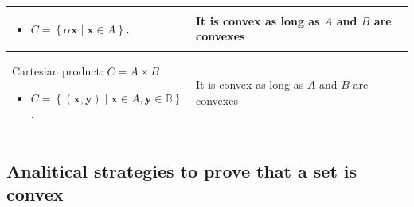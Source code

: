 \documentclass{article}
\begin{document}
\begin{xltabular}[l]{0.5\linewidth}{|X|X|}
\begin{itemize}[leftmargin=*]
		\item \(C = \left\{ \alpha \mathbf{x} \mid \mathbf{x} \in A \right\}\).
	\end{itemize} & It is convex as long as \(A\) and \(B\) are convexes\\
	\hline
	Cartesian product: $C = A \times B $
	\begin{itemize}[leftmargin=*]
		\item \(C = \left\{ (\mathbf{x}, \mathbf{y}) \mid \mathbf{x} \in A, \mathbf{y} \in \mathbb{B} \right\}\).
	\end{itemize} & It is convex as long as \(A\) and \(B\) are convexes\\
	\hline
\end{xltabular}

\subsection{Analitical strategies to prove that a set is convex}
\end{document}
